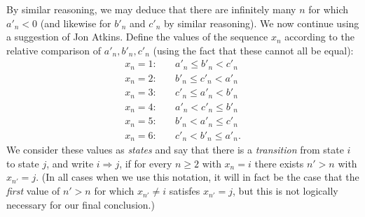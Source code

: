 \documentclass[amssymb,twocolumn,pra,10pt,aps]{revtex4-1}
\begin{document}
\begin{itemize}
By similar reasoning, we may deduce that there are infinitely many $n$ for which $a'_n < 0$ (and likewise for $b'_n$ and $c'_n$ by similar reasoning). We now continue using a suggestion of Jon Atkins.
Define the values of the sequence $x_n$ according to the relative comparison of $a'_n, b'_n, c'_n$ (using the fact that these cannot all be equal):
\begin{align*}
x_n = 1: & \quad a'_n \leq b'_n < c'_n \\
x_n = 2: & \quad b'_n \leq c'_n < a'_n \\
x_n = 3: & \quad c'_n \leq a'_n < b'_n \\
x_n = 4: & \quad a'_n < c'_n \leq b'_n \\
x_n = 5: & \quad b'_n < a'_n \leq c'_n \\
x_n = 6: & \quad c'_n < b'_n \leq a'_n.
\end{align*}
We consider these values as \emph{states} and say that there is a \emph{transition} from state $i$ to state $j$,
and write $i \Rightarrow j$, if for every $n \geq 2$ with $x_n = i$ there exists $n' > n$ with $x_{n'} = j$.
(In all cases when we use this notation, it will in fact be the case that the \emph{first} value of $n'>n$ for which
$x_{n'} \neq i$ satisfes $x_{n'} = j$, but this is not logically necessary for our final conclusion.) 


\end{itemize}
\end{document}
